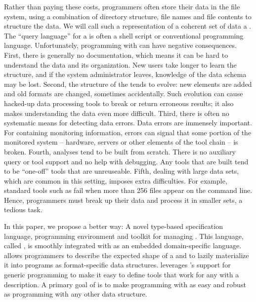 Rather than paying these costs, programmers often store their data in
the file system, using a combination of directory structure, file
names and file contents to structure the data.  We will call such a
representation of a coherent set of data a \textit{\filestore{}}.
The ``query language'' for a \filestore{}
is often a shell script or conventional programming language.
Unfortunately, programming with \filestores{} can have
negative consequences.  First, there is generally no documentation,
which means it can be hard to understand the data and its
organization.  New users take longer to learn the structure, and if
the system administrator leaves, knowledge of the data
schema may be lost.  Second, the structure of the \filestore{} tends
to evolve: new elements are added and old formats are changed, sometimes
accidentally.  Such evolution can cause hacked-up data processing
tools to break or return erroneous results; it also makes
understanding the data even more difficult.  Third, there is often no
systematic means for detecting data errors.  Data errors are immensely
important.  For \filestores{} containing monitoring information,
errors can signal that some portion of the monitored system
-- hardware, servers or other elements of the tool chain -- is
broken.  Fourth, analyses tend to be built from scratch.
There is no auxiliary query or tool support and no help with debugging.
Any tools that are built tend to be ``one-off'' tools that are
unreuseable.  Fifth, dealing with
large data sets, which are common in this setting, imposes extra
difficulties.  For example,  standard tools
such as  fail when more than 256 files appear on the
command line.  Hence, programmers must  break up their data
and process it in smaller sets, a tedious task.

%
%

In this paper, we propose a better way:  A novel type-based
specification language, programming environment and toolkit for
managing \filestores{}.
This language, called \forest{}, is smoothly integrated with
\haskell{} as an embedded domain-specific language.
\forest{} allows programmers to describe the expected shape of a
\filestore{} and to lazily materialize it into \haskell{} programs as
format-specific \haskell{} data structures.  \forest{} 
leverages \haskell{}'s support for generic programming to make it easy
to define tools that work for any \filestore{} with a \forest{}
description.  A primary goal of \forest{} is to make programming with \filestores{}
as easy and robust as programming with any other 
\haskell{} data structure.  

